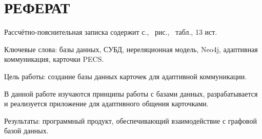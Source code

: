 \section*{РЕФЕРАТ}

Рассчётно-пояснительная записка содержит \pageref{LastPage} с., \totalfigures\ рис., \totaltables\ табл., 13 ист.

Ключевые слова: базы данных, СУБД, нереляционная модель, Neo4j, адаптивная коммуникация, карточки PECS.

Цель работы: создание базы данных карточек для адаптивной коммуникации.

В данной работе изучаются принципы работы с базами данных, разрабатывается и реализуется приложение для адаптивного общения карточками.

Результаты: программный продукт, обеспечивающий взаимодействие с графовой базой данных.

\pagebreak